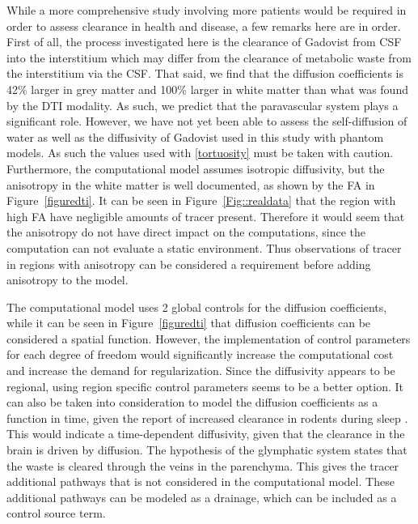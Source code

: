\documentclass[11pt,a4paper]{article}
\begin{document}
While a more comprehensive study involving more patients would be required in order to assess clearance in health and disease, a few remarks here are in order. 
First of all, the process investigated here is the clearance of Gadovist from CSF into the interstitium which may differ from the clearance of metabolic waste 
from the interstitium via the CSF. That said, 
we find that the diffusion coefficients is 42\% larger in grey matter and 100\% larger in white matter  than what was found by the DTI modality. As such, we predict that the paravascular system 
plays a significant role.  
However, we have not yet been able to assess the self-diffusion of water as well as the diffusivity of Gadovist used in this study with phantom models. As such 
the values used with \eqref{tortuosity} must be taken with caution. Furthermore,    
the computational model assumes isotropic diffusivity, but the anisotropy in the white matter is well documented, as shown by the FA in Figure~\ref{figuredti}. It can be seen in Figure~\ref{Fig::realdata} that the region with high FA have negligible amounts of tracer present. Therefore it would seem that the anisotropy do not have direct impact on the computations, since the computation can not evaluate a static environment. Thus observations of tracer in regions with anisotropy can be considered a requirement before adding anisotropy to the model.

The computational model uses 2 global controls for the diffusion coefficients, while it can be seen in  Figure~\ref{figuredti} that diffusion coefficients can be considered a spatial function. However, the implementation of control parameters for each degree of freedom would significantly increase the computational cost and increase the demand for regularization. Since the diffusivity appears to be regional, using region specific control parameters seems to be a better option.
It can also be taken into consideration to model the diffusion coefficients as a function in time, given the report of increased clearance in rodents during sleep \cite{xie2013sleep}. This would indicate a time-dependent diffusivity, given that the clearance in the brain is driven by diffusion. %
The hypothesis of the glymphatic system \cite{iliff2012paravascular} states that the waste is cleared through the veins in the parenchyma. This gives the tracer additional pathways that is not considered in the computational model. These additional pathways can be modeled as a drainage, which can be included as a control source term. 
\end{document}
